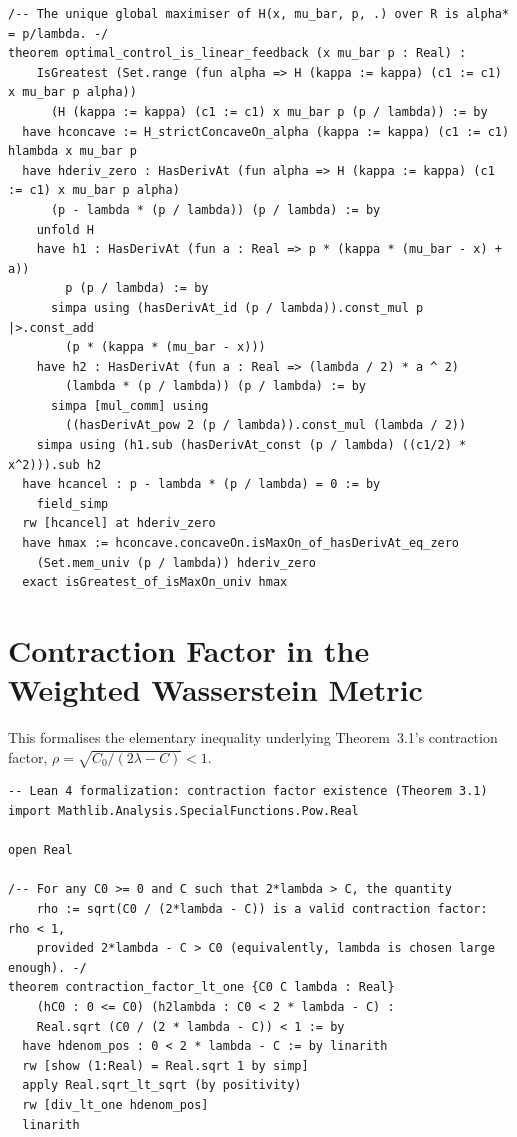 \begin{lstlisting}[style=lean4, caption={Optimality of the linear feedback control $\alpha^* = p/\lambda$ for the LQ-MFG Hamiltonian.}]
/-- The unique global maximiser of H(x, mu_bar, p, .) over R is alpha* = p/lambda. -/
theorem optimal_control_is_linear_feedback (x mu_bar p : Real) :
    IsGreatest (Set.range (fun alpha => H (kappa := kappa) (c1 := c1) x mu_bar p alpha))
      (H (kappa := kappa) (c1 := c1) x mu_bar p (p / lambda)) := by
  have hconcave := H_strictConcaveOn_alpha (kappa := kappa) (c1 := c1) hlambda x mu_bar p
  have hderiv_zero : HasDerivAt (fun alpha => H (kappa := kappa) (c1 := c1) x mu_bar p alpha)
      (p - lambda * (p / lambda)) (p / lambda) := by
    unfold H
    have h1 : HasDerivAt (fun a : Real => p * (kappa * (mu_bar - x) + a))
        p (p / lambda) := by
      simpa using (hasDerivAt_id (p / lambda)).const_mul p |>.const_add
        (p * (kappa * (mu_bar - x)))
    have h2 : HasDerivAt (fun a : Real => (lambda / 2) * a ^ 2)
        (lambda * (p / lambda)) (p / lambda) := by
      simpa [mul_comm] using
        ((hasDerivAt_pow 2 (p / lambda)).const_mul (lambda / 2))
    simpa using (h1.sub (hasDerivAt_const (p / lambda) ((c1/2) * x^2))).sub h2
  have hcancel : p - lambda * (p / lambda) = 0 := by
    field_simp
  rw [hcancel] at hderiv_zero
  have hmax := hconcave.concaveOn.isMaxOn_of_hasDerivAt_eq_zero
    (Set.mem_univ (p / lambda)) hderiv_zero
  exact isGreatest_of_isMaxOn_univ hmax
\end{lstlisting}


\section{Contraction Factor in the Weighted Wasserstein Metric}
\label{sec:appB-contraction-factor}

This formalises the elementary inequality underlying Theorem~3.1's
contraction factor, $\rho = \sqrt{C_0/(2\lambda - C)} < 1$.

\begin{lstlisting}[style=lean4, caption={Existence of contraction factor $\rho < 1$ for large $\lambda$.}]
-- Lean 4 formalization: contraction factor existence (Theorem 3.1)
import Mathlib.Analysis.SpecialFunctions.Pow.Real

open Real

/-- For any C0 >= 0 and C such that 2*lambda > C, the quantity
    rho := sqrt(C0 / (2*lambda - C)) is a valid contraction factor: rho < 1,
    provided 2*lambda - C > C0 (equivalently, lambda is chosen large enough). -/
theorem contraction_factor_lt_one {C0 C lambda : Real}
    (hC0 : 0 <= C0) (h2lambda : C0 < 2 * lambda - C) :
    Real.sqrt (C0 / (2 * lambda - C)) < 1 := by
  have hdenom_pos : 0 < 2 * lambda - C := by linarith
  rw [show (1:Real) = Real.sqrt 1 by simp]
  apply Real.sqrt_lt_sqrt (by positivity)
  rw [div_lt_one hdenom_pos]
  linarith
\end{lstlisting}


